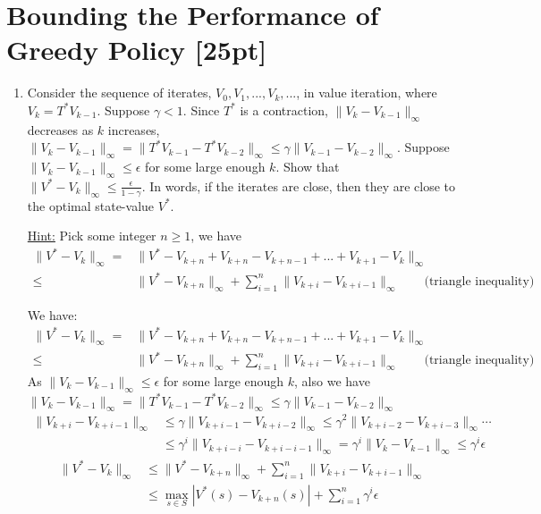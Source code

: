 \documentclass[11pt]{article}
\theoremstyle{case}
\newcommand{\norm}[2][2]{\| #2\|}
\begin{document}
\section{Bounding the Performance of Greedy Policy [25pt]}
\begin{enumerate}[label=(\alph*)]
    \item Consider the sequence of iterates, $V_0, V_1,...,V_k,...$, in value iteration, where $V_k = T^* V_{k-1}$.
    Suppose $\gamma<1$.
    Since $T^*$ is a contraction, $\norm{V_k-V_{k-1}}_\infty$ decreases as $k$ increases, $\norm{V_k-V_{k-1}}_\infty = \norm{T^*V_{k-1}-T^*V_{k-2}}_\infty \leq \gamma\norm{V_{k-1}-V_{k-2}}_\infty$.
    Suppose $\norm{V_k-V_{k-1}}_\infty \leq \epsilon$ for some large enough $k$.
    Show that $\norm{V^*-V_k}_\infty \leq \frac{\epsilon}{1-\gamma}$. In words, if the iterates are close, then they are close to the optimal state-value $V^*$.
    
    \underline{Hint:} Pick some integer $n\geq1$, we have 
    \begin{align*}
        \norm{V^*-V_k}_\infty =& \norm{V^*-V_{k+n} + V_{k+n} - V_{k+n-1} +...+V_{k+1}-V_k}_\infty \\
        \leq&  \norm{V^*-V_{k+n}}_\infty + \sum_{i=1}^{n} \norm{V_{k+i}-V_{k+i-1}}_\infty  \qquad \text {(triangle inequality)}
    \end{align*}
    \begin{shaded}
	We have:
    \begin{align*}
        \norm{V^*-V_k}_\infty =& \norm{V^*-V_{k+n} + V_{k+n} - V_{k+n-1} +...+V_{k+1}-V_k}_\infty \\
        \leq&  \norm{V^*-V_{k+n}}_\infty + \sum_{i=1}^{n} \norm{V_{k+i}-V_{k+i-1}}_\infty  \qquad \text {(triangle inequality)}
    \end{align*}
	As $\norm{V_k-V_{k-1}}_\infty \leq \epsilon$ for some large enough $k$, also we have $\norm{V_k-V_{k-1}}_\infty = \norm{T^*V_{k-1}-T^*V_{k-2}}_\infty \leq \gamma\norm{V_{k-1}-V_{k-2}}_\infty$
\begin{align*}
\norm{V_{k+i}-V_{k+i-1}}_\infty & \leq \gamma \norm{V_{k+i-1}-V_{k+i-2}}_\infty \leq \gamma^2 \norm{V_{k+i-2}-V_{k+i-3}}_\infty \cdots \\
														& \leq \gamma^{i} \norm{V_{k+i-i}-V_{k+i-i-1}}_\infty = \gamma^{i} \norm{V_{k}-V_{k-1}}_\infty \leq \gamma^{i} \epsilon
\end{align*}
\begin{align*}
        \norm{V^*-V_k}_\infty &\leq \norm{V^*-V_{k+n}}_\infty + \sum_{i=1}^{n} \norm{V_{k+i}-V_{k+i-1}}_\infty\\
								        &\leq \max_{s \in S}|V^*(s)-V_{k+n}(s)| + \sum_{i=1}^{n} \gamma^{i} \epsilon
\end{align*}


\end{shaded}
\end{enumerate}
\end{document}
